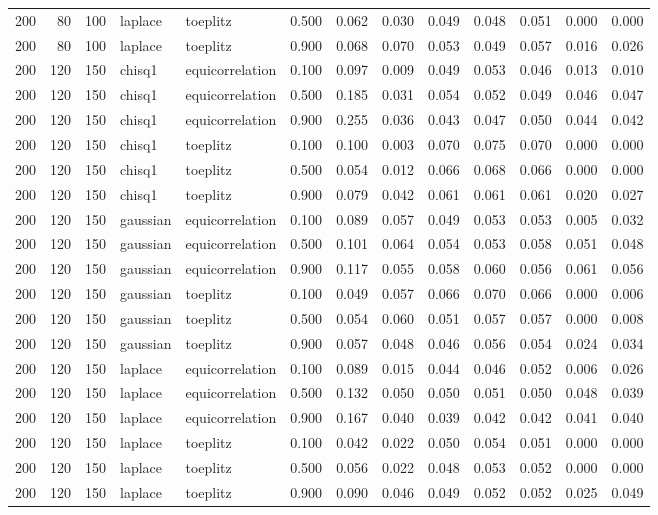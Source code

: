 \begin{tabular}{rrrllrrrrrrrr}
200 & 80 & 100 & laplace & toeplitz & 0.500 & 0.062 & 0.030 & 0.049 & 0.048 & 0.051 & 0.000 & 0.000 \\
200 & 80 & 100 & laplace & toeplitz & 0.900 & 0.068 & 0.070 & 0.053 & 0.049 & 0.057 & 0.016 & 0.026 \\
200 & 120 & 150 & chisq1 & equicorrelation & 0.100 & 0.097 & 0.009 & 0.049 & 0.053 & 0.046 & 0.013 & 0.010 \\
200 & 120 & 150 & chisq1 & equicorrelation & 0.500 & 0.185 & 0.031 & 0.054 & 0.052 & 0.049 & 0.046 & 0.047 \\
200 & 120 & 150 & chisq1 & equicorrelation & 0.900 & 0.255 & 0.036 & 0.043 & 0.047 & 0.050 & 0.044 & 0.042 \\
200 & 120 & 150 & chisq1 & toeplitz & 0.100 & 0.100 & 0.003 & 0.070 & 0.075 & 0.070 & 0.000 & 0.000 \\
200 & 120 & 150 & chisq1 & toeplitz & 0.500 & 0.054 & 0.012 & 0.066 & 0.068 & 0.066 & 0.000 & 0.000 \\
200 & 120 & 150 & chisq1 & toeplitz & 0.900 & 0.079 & 0.042 & 0.061 & 0.061 & 0.061 & 0.020 & 0.027 \\
200 & 120 & 150 & gaussian & equicorrelation & 0.100 & 0.089 & 0.057 & 0.049 & 0.053 & 0.053 & 0.005 & 0.032 \\
200 & 120 & 150 & gaussian & equicorrelation & 0.500 & 0.101 & 0.064 & 0.054 & 0.053 & 0.058 & 0.051 & 0.048 \\
200 & 120 & 150 & gaussian & equicorrelation & 0.900 & 0.117 & 0.055 & 0.058 & 0.060 & 0.056 & 0.061 & 0.056 \\
200 & 120 & 150 & gaussian & toeplitz & 0.100 & 0.049 & 0.057 & 0.066 & 0.070 & 0.066 & 0.000 & 0.006 \\
200 & 120 & 150 & gaussian & toeplitz & 0.500 & 0.054 & 0.060 & 0.051 & 0.057 & 0.057 & 0.000 & 0.008 \\
200 & 120 & 150 & gaussian & toeplitz & 0.900 & 0.057 & 0.048 & 0.046 & 0.056 & 0.054 & 0.024 & 0.034 \\
200 & 120 & 150 & laplace & equicorrelation & 0.100 & 0.089 & 0.015 & 0.044 & 0.046 & 0.052 & 0.006 & 0.026 \\
200 & 120 & 150 & laplace & equicorrelation & 0.500 & 0.132 & 0.050 & 0.050 & 0.051 & 0.050 & 0.048 & 0.039 \\
200 & 120 & 150 & laplace & equicorrelation & 0.900 & 0.167 & 0.040 & 0.039 & 0.042 & 0.042 & 0.041 & 0.040 \\
200 & 120 & 150 & laplace & toeplitz & 0.100 & 0.042 & 0.022 & 0.050 & 0.054 & 0.051 & 0.000 & 0.000 \\
200 & 120 & 150 & laplace & toeplitz & 0.500 & 0.056 & 0.022 & 0.048 & 0.053 & 0.052 & 0.000 & 0.000 \\
200 & 120 & 150 & laplace & toeplitz & 0.900 & 0.090 & 0.046 & 0.049 & 0.052 & 0.052 & 0.025 & 0.049 \\
\bottomrule
\end{tabular}
